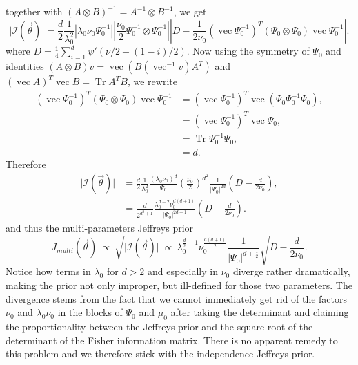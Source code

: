 \documentclass[11pt, oneside]{article}   	%
\DeclareMathOperator{\Tr}{Tr}
\begin{document}
together with $(A\otimes B)^{-1} = A^{-1}\otimes B^{-1}$, we get
\begin{equation}
\vert\mathcal I(\vec\theta)\vert = \frac{d}{2}\frac{1}{\lambda_0^2}\left\vert\lambda_0\nu_0\Psi_0^{-1}\right\vert\left\vert \frac{\nu_0}{2}\Psi_0^{-1}\otimes\Psi_0^{-1}\right\vert\left\vert D - \frac{1}{2\nu_0}(\operatorname{vec}\Psi_0^{-1})^T(\Psi_0\otimes\Psi_0)\operatorname{vec}\Psi_0^{-1} \right\vert.
\end{equation}
where $D = \frac{1}{4}\sum_{i=1}^d\psi'(\nu/2+(1-i)/2)$. Now using the symmetry of $\Psi_0$ and identities $(A\otimes B) v = \operatorname{vec}(B(\operatorname{vec}^{-1} v) A^T)$ and $(\operatorname{vec} A)^T \operatorname{vec} B = \Tr A^T B$, we rewrite
\begin{equation}\begin{split}
(\operatorname{vec}\Psi_0^{-1})^T(\Psi_0\otimes\Psi_0)\operatorname{vec}\Psi_0^{-1} &=  (\operatorname{vec}\Psi_0^{-1})^T\operatorname{vec}(\Psi_0 \Psi_0^{-1}\Psi_0) ,\\
&= (\operatorname{vec}\Psi_0^{-1})^T\operatorname{vec}\Psi_0,\\
&= \Tr\Psi_0^{-1}\Psi_0,\\
&= d.
\end{split}\end{equation}
Therefore
\begin{equation}\begin{split}
\vert\mathcal I(\vec\theta)\vert &= \frac{d}{2}\frac{1}{\lambda_0^2}\frac{(\lambda_0\nu_0)^d}{\vert\Psi_0\vert}\left(\frac{\nu_0}{2}\right)^{d^2}\frac{1}{\vert\Psi_0\vert^{2d}}\left(D - \frac{d}{2\nu_0}\right), \\
&= \frac{d}{2^{d^2 + 1}}\frac{\lambda_0^{d-2}\nu_0^{d(d + 1)}}{\vert\Psi_0\vert^{2d + 1}}\left(D -\frac{d}{2\nu_0}\right).
\end{split}\end{equation}
and thus the multi-parameters Jeffreys prior
$$J_{multi}(\vec\theta)~\propto~ \sqrt{\vert\mathcal I(\vec\theta)\vert}~\propto~\lambda_0^{\frac{d}{2}-1}\nu_0^{\frac{d(d+1)}{2}}\frac{1}{\vert\Psi_0\vert^{d+\frac{1}{2}}}\sqrt{D - \frac{d}{2\nu_0}}.$$
Notice how terms in $\lambda_0$ for $d > 2$ and especially in $\nu_0$ diverge rather dramatically, making the prior not only improper, but ill-defined for those two parameters. The divergence stems from the fact that we cannot immediately get rid of the factors $\nu_0$ and $\lambda_0\nu_0$ in the blocks of $\Psi_0$ and $\mu_0$ after taking the determinant and claiming the proportionality between the Jeffreys prior and the square-root of the determinant of the Fisher information matrix. There is no apparent remedy to this problem and we therefore stick with the independence Jeffreys prior.
\end{document}
